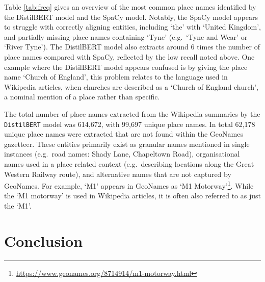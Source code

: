 \documentclass[]{interact}
\theoremstyle{plain}%
\theoremstyle{definition}
\theoremstyle{remark}
\begin{document}
Table \ref{tab:freq} gives an overview of the most common place names
identified by the DistilBERT model and the SpaCy model. Notably, the
SpaCy model appears to struggle with correctly aligning entities,
including `the' with `United Kingdom', and partially missing place names
containing `Tyne' (e.g.~`Tyne and Wear' or `River Tyne'). The DistilBERT
model also extracts around 6 times the number of place names compared
with SpaCy, reflected by the low recall noted above. One example where
the DistilBERT model appears confused is by giving the place name
`Church of England', this problem relates to the language used in
Wikipedia articles, when churches are described as a `Church of England
church', a nominal mention of a place rather than specific.

The total number of place names extracted from the Wikipedia summaries
by the \texttt{DistilBERT} model was 614,672, with 99,697 unique place
names. In total 62,178 unique place names were extracted that are not
found within the GeoNames gazetteer. These entities primarily exist as
granular names mentioned in single instances (e.g.~road names: Shady
Lane, Chapeltown Road), organisational names used in a place related
context (e.g.~describing locations along the Great Western Railway
route), and alternative names that are not captured by GeoNames. For
example, `M1' appears in GeoNames as `M1 Motorway'\footnote{\url{https://www.geonames.org/8714914/m1-motorway.html}}.
While the `M1 motorway' is used in Wikipedia articles, it is often also
referred to as just the `M1'.

\hypertarget{conclusion}{%
\section{Conclusion}\label{conclusion}}
\end{document}
